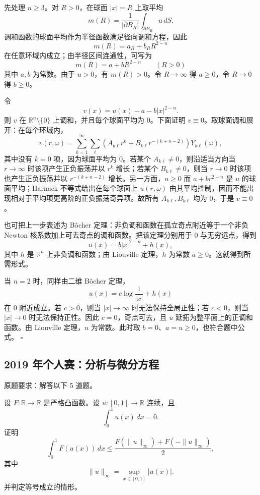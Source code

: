 \documentclass[UTF8,12pt]{ctexart}
\newcommand{\R}{\mathbb R}
\newcounter{problem}
\newenvironment{problem}[1][]{%
  \refstepcounter{problem}
  \par\bigskip
  \noindent{\large\bfseries 题目 \theproblem\if\relax\detokenize{#1}\relax\else\quad #1\fi}\par
  \smallskip
  \noindent\ignorespaces
}{\par}
\newenvironment{solution}{%
  \par\medskip
  \noindent{\bfseries 解答}\quad\ignorespaces
}{\hfill$\square$\par\medskip}
\begin{document}
\begin{solution}
先处理 \(n\ge3\)。对 \(R>0\)，在球面 \(|x|=R\) 上取平均
\[
m(R)=\frac1{|\partial B_R|}\int_{\partial B_R}u\,dS.
\]
调和函数的球面平均作为半径函数满足径向调和方程，因此
\[
m(R)=a_R+b_R R^{2-n}
\]
在任意环域内成立；由半径区间连通性，可写为
\[
m(R)=a+bR^{2-n}\qquad(R>0)
\]
其中 \(a,b\) 为常数。由于 \(u>0\)，有 \(m(R)>0\)。令 \(R\to\infty\) 得 \(a\ge0\)，令 \(R\to0\) 得 \(b\ge0\)。

令
\[
v(x)=u(x)-a-b|x|^{2-n}.
\]
则 \(v\) 在 \(\R^n\setminus\{0\}\) 上调和，并且每个球面平均为 \(0\)。下面证明 \(v\equiv0\)。取球面调和展开：在每个环域内，
\[
v(r,\omega)=\sum_{k=1}^\infty\sum_{\ell}
\left(A_{k\ell}r^k+B_{k\ell}r^{-(k+n-2)}\right)Y_{k\ell}(\omega),
\]
其中没有 \(k=0\) 项，因为球面平均为 \(0\)。若某个 \(A_{k\ell}\ne0\)，则沿适当方向当 \(r\to\infty\) 时该项产生正负振荡并以 \(r^k\) 增长；若某个 \(B_{k\ell}\ne0\)，则当 \(r\to0\) 时该项也产生正负振荡并以 \(r^{-(k+n-2)}\) 增长。另一方面，\(u\ge0\) 而 \(a+b r^{2-n}\) 是 \(u\) 的球面平均；Harnack 不等式给出在每个球面上 \(u(r,\omega)\) 由其平均控制，因而不能出现相对于平均项更高阶的正负振荡奇异项。故所有 \(A_{k\ell},B_{k\ell}\) 均为 \(0\)，于是 \(v\equiv0\)。

也可把上一步表述为 Bôcher 定理：非负调和函数在孤立奇点附近等于一个非负 Newton 核系数加上可去奇点的调和函数。把该定理分别用于 \(0\) 与无穷远点，得到
\[
u(x)=b|x|^{2-n}+h(x),
\]
其中 \(h\) 是 \(\R^n\) 上非负调和函数；由 Liouville 定理，\(h\) 为常数 \(a\ge0\)。这就得到所需形式。

当 \(n=2\) 时，同样由二维 Bôcher 定理，
\[
u(x)=c\log\frac1{|x|}+h(x)
\]
在 \(0\) 附近成立。若 \(c>0\)，则当 \(|x|\to\infty\) 时无法保持全局正性；若 \(c<0\)，则当 \(|x|\to0\) 时无法保持正性。因此 \(c=0\)，奇点可去，且 \(u\) 延拓为整平面上的正调和函数。由 Liouville 定理，\(u\) 为常数。此时取 \(b=0\)、\(a=u\ge0\)，也符合题中公式。
\end{solution}

\subsection{2019 年个人赛：分析与微分方程}

原题要求：解答以下 5 道题。

\begin{problem}
设 \(F:\R\to\R\) 是严格凸函数。设 \(u:[0,1]\to\R\) 连续，且
\[
\int_0^1 u(x)\,dx=0.
\]
证明
\[
\int_0^1 F(u(x))\,dx
\le
\frac{F(\|u\|_\infty)+F(-\|u\|_\infty)}2,
\]
其中
\[
\|u\|_\infty=\sup_{x\in[0,1]}|u(x)|.
\]
并判定等号成立的情形。
\end{problem}
\end{document}
